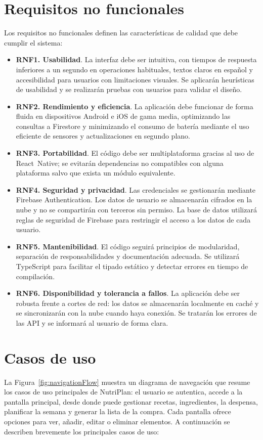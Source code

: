 \documentclass[twoside, openright, 11pt]{report}
\begin{document}
\section{Requisitos no funcionales}
\label{sec.requisitosnofuncionales}
Los requisitos no funcionales definen las características de calidad que debe cumplir el sistema:

\begin{itemize}
  \item \textbf{RNF1. Usabilidad}. La interfaz debe ser intuitiva, con tiempos de respuesta inferiores a un segundo en operaciones habituales, textos claros en español y accesibilidad para usuarios con limitaciones visuales. Se aplicarán heurísticas de usabilidad y se realizarán pruebas con usuarios para validar el diseño.
  \item \textbf{RNF2. Rendimiento y eficiencia}. La aplicación debe funcionar de forma fluida en dispositivos Android e iOS de gama media, optimizando las consultas a Firestore y minimizando el consumo de batería mediante el uso eficiente de sensores y actualizaciones en segundo plano.
  \item \textbf{RNF3. Portabilidad}. El código debe ser multiplataforma gracias al uso de React Native; se evitarán dependencias no compatibles con alguna plataforma salvo que exista un módulo equivalente.
  \item \textbf{RNF4. Seguridad y privacidad}. Las credenciales se gestionarán mediante Firebase Authentication. Los datos de usuario se almacenarán cifrados en la nube y no se compartirán con terceros sin permiso. La base de datos utilizará reglas de seguridad de Firebase para restringir el acceso a los datos de cada usuario.
  \item \textbf{RNF5. Mantenibilidad}. El código seguirá principios de modularidad, separación de responsabilidades y documentación adecuada. Se utilizará TypeScript para facilitar el tipado estático y detectar errores en tiempo de compilación.
  \item \textbf{RNF6. Disponibilidad y tolerancia a fallos}. La aplicación debe ser robusta frente a cortes de red: los datos se almacenarán localmente en caché y se sincronizarán con la nube cuando haya conexión. Se tratarán los errores de las API y se informará al usuario de forma clara.
\end{itemize}

\section{Casos de uso}
\label{sec.casouso}
La Figura~\ref{fig:navigationFlow} muestra un diagrama de navegación que resume los casos de uso principales de NutriPlan: el usuario se autentica, accede a la pantalla principal, desde donde puede gestionar recetas, ingredientes, la despensa, planificar la semana y generar la lista de la compra. Cada pantalla ofrece opciones para ver, añadir, editar o eliminar elementos. A continuación se describen brevemente los principales casos de uso:
\end{document}
